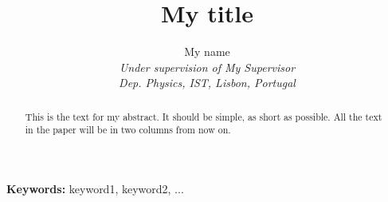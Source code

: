 \documentclass[a4paper,11pt,oneside]{article} %
\begin{document}

%
%
\title{My title}
\author{My name\\
\textit{Under supervision of My Supervisor}\\ %
\textit{Dep. Physics, IST, Lisbon, Portugal}}
\maketitle
\begin{abstract}
This is the text for my abstract. It should be simple, as short as possible. All the text in the paper will be in two columns from now on.
\end{abstract}

\bigskip
\textbf{\Large Keywords:} keyword1, keyword2, ...
\bigskip

%
%
%



%
%





%
%




%
%


\end{document}
